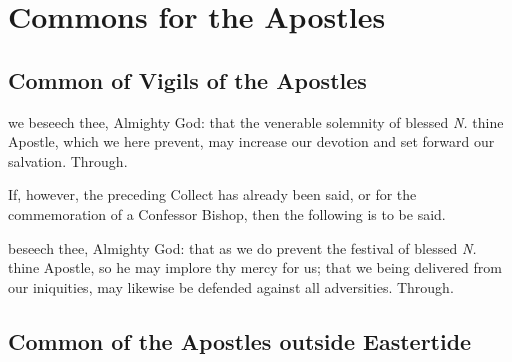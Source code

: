 \fancyhead[RO,LE]{}
\fancyhead[RE,LO]{}

\section{Commons for the Apostles}

\subsection{Common of Vigils of the Apostles}\label{CommonVigilApostles}

\collect
{} we beseech thee, Almighty God: that the venerable solemnity of blessed \textit{N.} thine Apostle, which we here prevent, may increase our devotion and set forward our salvation. Through.
\begin{rubric}
	If, however, the preceding Collect has already been said, or for the commemoration of a Confessor Bishop, then the following is to be said.
\end{rubric}
 beseech thee, Almighty God: that as we do prevent the festival of blessed \textit{N.} thine Apostle, so he may implore thy mercy for us; that we being delivered from our iniquities, may likewise be defended against all adversities. Through.


\subsection{Common of the Apostles outside Eastertide}\label{CommonApostles}


